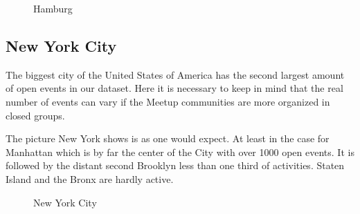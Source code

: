 \begin{figure}[!htp]
	\hfill
	\caption{Hamburg}
\end{figure}

\subsection*{New York City}

The biggest city of the United States of America has the second largest amount of open events in our dataset. Here it is necessary to keep in mind that the real number of events can vary if the Meetup communities are more organized in closed groups. 

The picture New York shows is as one would expect. At least in the case for Manhattan which is by far the center of the City with over 1000 open events. It is followed by the distant second Brooklyn less than one third of activities. Staten Island and the Bronx are hardly active. 

\begin{figure}[!t]
	\hfill
	\caption{New York City}\label{fig:newyorkmap}
\end{figure}

